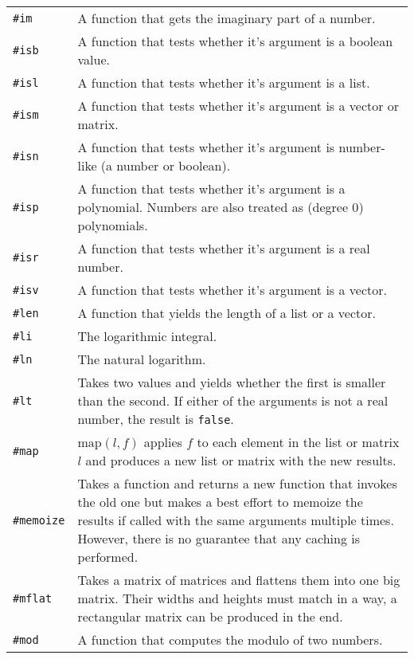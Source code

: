 \documentclass[10pt]{article}
\begin{document}
\begin{longtable}{p{}p{}}
        \verb|#im|        & A function that gets the imaginary part of a number. \\
        \verb|#isb|       & A function that tests whether it's argument is a boolean value. \\
        \verb|#isl|       & A function that tests whether it's argument is a list. \\
        \verb|#ism|       & A function that tests whether it's argument is a vector or matrix. \\
        \verb|#isn|       & A function that tests whether it's argument is number-like (a number or boolean). \\
        \verb|#isp|       & A function that tests whether it's argument is a polynomial. Numbers are also treated as (degree $ 0 $) polynomials. \\
        \verb|#isr|       & A function that tests whether it's argument is a real number. \\
        \verb|#isv|       & A function that tests whether it's argument is a vector. \\
        \verb|#len|       & A function that yields the length of a list or a vector. \\
        \verb|#li|        & The logarithmic integral. \\
        \verb|#ln|        & The natural logarithm. \\
        \verb|#lt|        & Takes two values and yields whether the first is smaller than the second.
                            If either of the arguments is not a real number, the result is \verb|false|. \\
        \verb|#map|       & $ \mathrm{map}(l,f) $ applies $ f $ to each element in the list or matrix  $ l $ and produces a new list or matrix with the new results. \\
        \verb|#memoize|   & Takes a function and returns a new function that invokes the old one but makes a best effort to memoize the results if called with the same arguments multiple times.
                            However, there is no guarantee that any caching is performed. \\
        \verb|#mflat|     & Takes a matrix of matrices and flattens them into one big matrix.
                            Their widths and heights must match in a way, a rectangular matrix can be produced in the end. \\
        \verb|#mod|       & A function that computes the modulo of two numbers. \\

\end{longtable}
\end{document}
